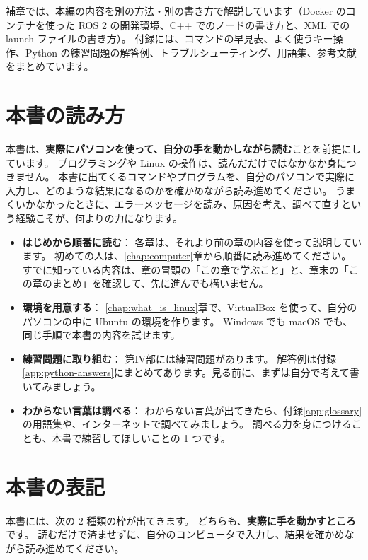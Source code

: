 補章では、本編の内容を別の方法・別の書き方で解説しています（Docker のコンテナを使った ROS 2 の開発環境、C++ でのノードの書き方と、XML での launch ファイルの書き方）。
付録には、コマンドの早見表、よく使うキー操作、Python の練習問題の解答例、トラブルシューティング、用語集、参考文献をまとめています。

\section*{本書の読み方}

本書は、\textbf{実際にパソコンを使って、自分の手を動かしながら読む}ことを前提にしています。
プログラミングや Linux の操作は、読んだだけではなかなか身につきません。
本書に出てくるコマンドやプログラムを、自分のパソコンで実際に入力し、どのような結果になるのかを確かめながら読み進めてください。
うまくいかなかったときに、エラーメッセージを読み、原因を考え、調べて直すという経験こそが、何よりの力になります。

\begin{itemize}
  \item \textbf{はじめから順番に読む}：
    各章は、それより前の章の内容を使って説明しています。
    初めての人は、\ref{chap:computer}章から順番に読み進めてください。
    すでに知っている内容は、章の冒頭の「この章で学ぶこと」と、章末の「この章のまとめ」を確認して、先に進んでも構いません。
  \item \textbf{環境を用意する}：
    \ref{chap:what_is_linux}章で、VirtualBox を使って、自分のパソコンの中に Ubuntu の環境を作ります。
    Windows でも macOS でも、同じ手順で本書の内容を試せます。
  \item \textbf{練習問題に取り組む}：
    第IV部には練習問題があります。
    解答例は付録\ref{app:python-answers}にまとめてあります。見る前に、まずは自分で考えて書いてみましょう。
  \item \textbf{わからない言葉は調べる}：
    わからない言葉が出てきたら、付録\ref{app:glossary}の用語集や、インターネットで調べてみましょう。
    調べる力を身につけることも、本書で練習してほしいことの 1 つです。
\end{itemize}


\section*{本書の表記}

本書には、次の 2 種類の枠が出てきます。
どちらも、\textbf{実際に手を動かすところ}です。
読むだけで済ませずに、自分のコンピュータで入力し、結果を確かめながら読み進めてください。

